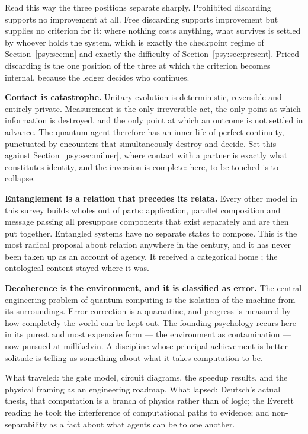 Read this way the three positions separate sharply.
Prohibited discarding supports no improvement at all.
Free discarding supports improvement but supplies no criterion for
it: where nothing costs anything, what survives is settled by
whoever holds the system, which is exactly the checkpoint regime of
Section~\ref{psy:sec:nn} and exactly the difficulty of
Section~\ref{psy:sec:present}.
Priced discarding is the one position of the three at which the
criterion becomes internal, because the ledger decides who
continues.

\textbf{Contact is catastrophe.}
Unitary evolution is deterministic, reversible and entirely private.
Measurement is the only irreversible act, the only point at which
information is destroyed, and the only point at which an outcome is
not settled in advance.
The quantum agent therefore has an inner life of perfect continuity,
punctuated by encounters that simultaneously destroy and decide.
Set this against Section~\ref{psy:sec:milner}, where contact with a
partner is exactly what constitutes identity, and the inversion is
complete: here, to be touched is to collapse.

\textbf{Entanglement is a relation that precedes its relata.}
Every other model in this survey builds wholes out of parts:
application, parallel composition and message passing all presuppose
components that exist separately and are then put together.
Entangled systems have no separate states to compose.
This is the most radical proposal about relation anywhere in the
century, and it has never been taken up as an account of agency.
It received a categorical home \cite{abramskycoecke2004}; the
ontological content stayed where it was.

\textbf{Decoherence is the environment, and it is classified as
error.}
The central engineering problem of quantum computing is the
isolation of the machine from its surroundings.
Error correction is a quarantine, and progress is measured by how
completely the world can be kept out.
The founding psychology recurs here in its purest and most expensive
form --- the environment as contamination --- now pursued at
millikelvin.
A discipline whose principal achievement is better solitude is
telling us something about what it takes computation to be.

What traveled: the gate model, circuit diagrams, the speedup
results, and the physical framing as an engineering roadmap.
What lapsed: Deutsch's actual thesis, that computation is a branch
of physics rather than of logic; the Everett reading he took the
interference of computational paths to evidence; and non-separability
as a fact about what agents can be to one another.

